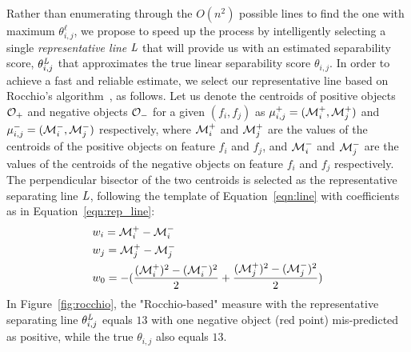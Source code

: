  Rather than enumerating through the $O(n^2)$ possible lines to find the one with maximum $\theta_{i,j}^{\ell}$, we propose to speed up the process by intelligently selecting a single {\em representative line} $\mathit{L}$ that will provide us with an estimated separability score, $\theta_{i,j}^{\mathit{L}}$ that approximates the true linear separability score $\theta_{i, j}$.
In order to achieve a fast and reliable estimate, we select our representative line based on Rocchio's algorithm~\cite{rocchio1971relevance}, as follows.
Let us denote the centroids of positive objects ${\mathcal{O}}_+$ and negative objects ${\mathcal{O}}_-$ for a given $(f_i,f_j)$ as $\mu_{i,j}^+=({\mathcal{M}}_i^+,{\mathcal{M}}_j^+)$ and $\mu_{i,j}^-=({\mathcal{M}}_i^-,{\mathcal{M}}_j^-)$ respectively, where ${\mathcal{M}}_i^+$ and ${\mathcal{M}}_j^+$ are the values of the centroids of the positive objects on feature $f_i$ and $f_j$, and ${\mathcal{M}}_i^-$ and ${\mathcal{M}}_j^-$ are the values of the centroids of the negative objects on feature $f_i$ and $f_j$ respectively. The perpendicular bisector of the two centroids is selected as the representative separating line $\mathit{L}$, following the template of Equation~\ref{eqn:line} with coefficients as in Equation~\ref{eqn:rep_line}:
\begin{equation}\label{eqn:rep_line}
\begin{split}
& w_i = {\mathcal{M}}_i^+-{\mathcal{M}}_i^- \\
& w_j = {\mathcal{M}}_j^+-{\mathcal{M}}_j^- \\
& w_0 = -(\frac{({\mathcal{M}}_i^+)^2-({\mathcal{M}}_i^-)^2}{2}+\frac{({\mathcal{M}}_j^+)^2-({\mathcal{M}}_j^-)^2}{2})
\end{split}
\end{equation}
\noindent In Figure~\ref{fig:rocchio}, the "Rocchio-based" measure with the representative separating line $\theta_{i,j}^{\mathit{L}}$ equals $13$ with one negative object (red point) mis-predicted as positive, while the true $\theta_{i,j}$ also equals $13$.

